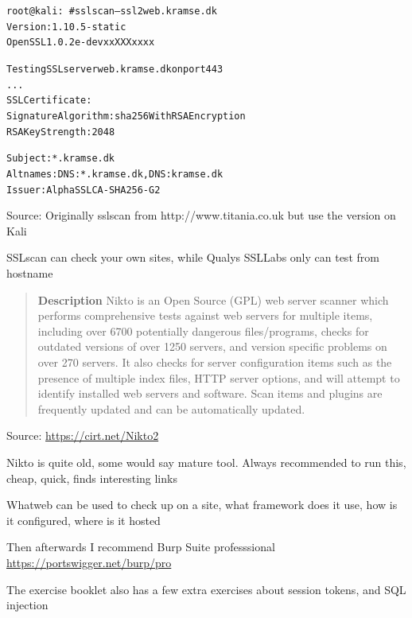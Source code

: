 \documentclass[Screen16to9,17pt]{foils}
\begin{document}

\begin{alltt}\small
root@kali:~# sslscan --ssl2 web.kramse.dk
Version: 1.10.5-static
OpenSSL 1.0.2e-dev xx XXX xxxx

Testing SSL server web.kramse.dk on port 443
...
  SSL Certificate:
Signature Algorithm: sha256WithRSAEncryption
RSA Key Strength:    2048

Subject:  *.kramse.dk
Altnames: DNS:*.kramse.dk, DNS:kramse.dk
Issuer:   AlphaSSL CA - SHA256 - G2
\end{alltt}

Source:
Originally sslscan from http://www.titania.co.uk
 but use the version on Kali

SSLscan can check your own sites, while Qualys SSLLabs only can test from hostname







\begin{quote}\footnotesize
{\bf Description}
Nikto is an Open Source (GPL) web server scanner which performs comprehensive tests against web servers for multiple items, including over 6700 potentially dangerous files/programs, checks for outdated versions of over 1250 servers, and version specific problems on over 270 servers. It also checks for server configuration items such as the presence of multiple index files, HTTP server options, and will attempt to identify installed web servers and software. Scan items and plugins are frequently updated and can be automatically updated.
\end{quote}
Source: \url{https://cirt.net/Nikto2}

\begin{list2}
\item Nikto is quite old, some would say mature tool. Always recommended to run this, cheap, quick, finds interesting links
\item Whatweb can be used to check up on a site, what framework does it use, how is it configured, where is it hosted
\item Then afterwards I recommend Burp Suite professsional \url{https://portswigger.net/burp/pro}
\item The exercise booklet also has a few extra exercises about session tokens, and SQL injection
\end{list2}
\end{document}
